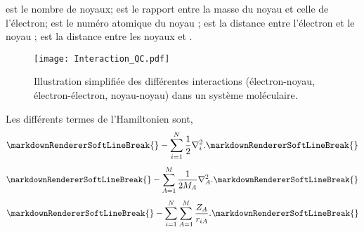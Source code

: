 \markdownRendererUlItem {} est le nombre de noyaux;\markdownRendererUlItemEnd 
\markdownRendererUlItem {} est le rapport entre la masse du noyau  et celle de l'électron;\markdownRendererUlItemEnd 
\markdownRendererUlItem {} est le numéro atomique du noyau ;\markdownRendererUlItemEnd 
\markdownRendererUlItem {} est la distance entre l’électron  et le noyau ;\markdownRendererUlItemEnd 
\markdownRendererUlItem {} est la distance entre les noyaux  et .\markdownRendererUlItemEnd 
\markdownRendererUlEndTight \markdownRendererInterblockSeparator
{}\begin{figure}[tbph]\markdownRendererSoftLineBreak
{}\centering\markdownRendererSoftLineBreak
{}\texttt{[image: Interaction\_QC.pdf]}\markdownRendererSoftLineBreak
{}\caption{Illustration simplifiée des différentes interactions (électron-noyau, électron-électron, noyau-noyau) dans un système moléculaire.}\markdownRendererSoftLineBreak
{}\label{fig:interactionqc}\markdownRendererSoftLineBreak
{}\end{figure}\markdownRendererParagraphSeparator
{}Les différents termes de l'Hamiltonien sont,\markdownRendererInterblockSeparator
{}\markdownRendererOlBegin
{}\markdownRendererSoftLineBreak
{}\begin{equation}\markdownRendererSoftLineBreak
{}-\sum_{i=1}^N \frac12 \nabla_i^2.\markdownRendererSoftLineBreak
{}\end{equation}\markdownRendererOlItemEnd 
{}\markdownRendererSoftLineBreak
{}\begin{equation}\markdownRendererSoftLineBreak
{}-\sum_{A=1}^M \frac{1}{2M_A} \nabla_A^2 .\markdownRendererSoftLineBreak
{}\end{equation}\markdownRendererOlItemEnd 
{}\markdownRendererSoftLineBreak
{}\begin{equation}\markdownRendererSoftLineBreak
{}-\sum_{i=1}^N \sum_{A=1}^M \frac{Z_A}{r_{iA}} .\markdownRendererSoftLineBreak
{}\end{equation}\markdownRendererOlItemEnd 
